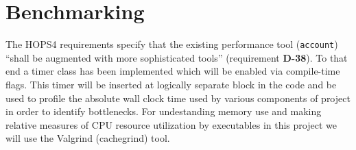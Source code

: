 %
%
\section{Benchmarking}
\label{sec:benchmark}

The HOPS4 requirements specify that the existing performance tool (\texttt{account}) ``shall be augmented with more sophisticated tools'' (requirement \textbf{D-38}).
To that end a timer class has been implemented which will be enabled via compile-time flags.  This timer will be inserted at logically separate block in the code and be 
used to profile the absolute wall clock time used by various components of project in order to identify bottlenecks. 
For undestanding memory use and making relative measures of CPU resource utilization by executables in this project we will use the Valgrind (cachegrind) tool.

%
%
